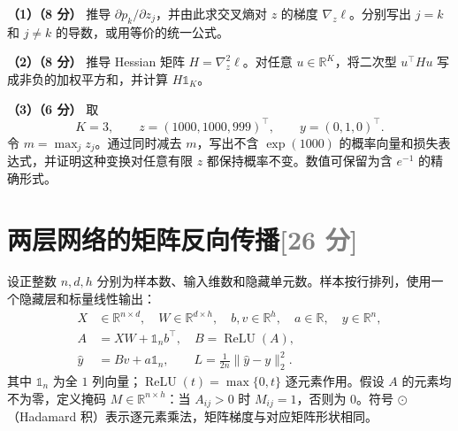 \documentclass[11pt,a4paper]{article}
\newcommand{\R}{\mathbb R}
\newcommand{\relu}{\operatorname{ReLU}}
\newcommand{\partq}[2]{\par\Needspace{5\baselineskip}\noindent\textbf{（#1）（#2 分）}}
\begin{document}
\partq{1}{8} 推导 $\partial p_k/\partial z_j$，并由此求交叉熵对 $z$ 的梯度 $\nabla_z\ell$。分别写出 $j=k$ 和 $j\ne k$ 的导数，或用等价的统一公式。

\partq{2}{8} 推导 Hessian 矩阵 $H=\nabla_z^2\ell$。对任意 $u\in\R^K$，将二次型 $u^\top Hu$ 写成非负的加权平方和，并计算 $H\mathds{1}_K$。

\partq{3}{6} 取
\[
K=3,\qquad z=(1000,1000,999)^\top,\qquad y=(0,1,0)^\top.
\]
令 $m=\max_jz_j$。通过同时减去 $m$，写出不含 $\exp(1000)$ 的概率向量和损失表达式，并证明这种变换对任意有限 $z$ 都保持概率不变。数值可保留为含 $e^{-1}$ 的精确形式。

\clearpage
\section[两层网络的矩阵反向传播]{两层网络的矩阵反向传播\hfill\textcolor{gray}{[26 分]}}

设正整数 $n,d,h$ 分别为样本数、输入维数和隐藏单元数。样本按行排列，使用一个隐藏层和标量线性输出：
\[
\begin{aligned}
X&\in\R^{n\times d},\quad W\in\R^{d\times h},\quad b,v\in\R^h,
\quad a\in\R,\quad y\in\R^n,\\
A&=XW+\mathds{1}_n b^\top,\quad B=\relu(A),\\
\widehat y&=Bv+a\mathds{1}_n,\qquad L=\frac1{2n}\|\widehat y-y\|_2^2.
\end{aligned}
\]
其中 $\mathds{1}_n$ 为全 $1$ 列向量；$\relu(t)=\max\{0,t\}$ 逐元素作用。假设 $A$ 的元素均不为零，定义掩码 $M\in\R^{n\times h}$：当 $A_{ij}>0$ 时 $M_{ij}=1$，否则为 $0$。符号 $\odot$ （Hadamard 积）表示逐元素乘法，矩阵梯度与对应矩阵形状相同。
\end{document}
